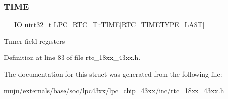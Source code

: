 \subsubsection{\texorpdfstring{T\+I\+ME}{TIME}}
{\footnotesize\ttfamily \hyperlink{core__sc300_8h_aec43007d9998a0a0e01faede4133d6be}{\+\_\+\+\_\+\+IO} uint32\+\_\+t L\+P\+C\+\_\+\+R\+T\+C\+\_\+\+T\+::\+T\+I\+ME\mbox{[}\hyperlink{group___r_t_c__18_x_x__43_x_x_gga8144898fe628404d396db06dc8aac0e0a0d4fafef57b6ef363f9a0875ff339cad}{R\+T\+C\+\_\+\+T\+I\+M\+E\+T\+Y\+P\+E\+\_\+\+L\+A\+ST}\mbox{]}}

Timer field registers 

Definition at line 83 of file rtc\+\_\+18xx\+\_\+43xx.\+h.



The documentation for this struct was generated from the following file\+:\begin{DoxyCompactItemize}
\item 
muju/externals/base/soc/lpc43xx/lpc\+\_\+chip\+\_\+43xx/inc/\hyperlink{rtc__18xx__43xx_8h}{rtc\+\_\+18xx\+\_\+43xx.\+h}\end{DoxyCompactItemize}
